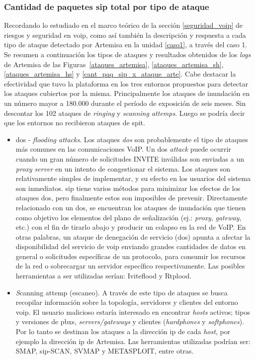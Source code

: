 \documentclass[a4paper,12pt]{report}
\begin{document}
{\subsubsection{Cantidad de paquetes \ac{sip} total por tipo de ataque}
Recordando lo estudiado en el marco teórico de la sección \ref{seguridad_voip}
de riesgos y seguridad en \ac{voip}, como así también la descripción y respuesta a
cada tipo de ataque detectado por Artemisa en la unidad \ref{caso1}, a través del caso 1.
Se resumen a continuación los tipos de ataques y resultados obtenidos de los \emph{logs}
de Artemisa de las 
\mbox{Figuras}~\ref{ataques_artemisa}, \ref{ataques_artemisa_sh}, \ref{ataques_artemisa_hs} y
\ref{cant_paq_sip_x_ataque_arte}. Cabe destacar la efectividad que tuvo la plataforma
en los tres entornos propuestos para
detectar los ataques cubiertos por la misma. Principalmente los ataques de
inundación en un número mayor a 180.000 durante el período de exposición de
seis meses. Sin descontar los 102 ataques de \emph{\emph{ringing}} y \emph{scanning
attemps}. Luego se podría decir que los entornos no recibieron ataques de
\ac{spit}.

\begin{itemize}

\item \ac{dos} - \emph{flooding attacks}.
Los ataques \emph{\ac{dos}} son probablemente el tipo de ataques
más comunes en las comunicaciones VoIP. Un \ac{dos} \emph{attack} puede ocurrir
cuando un gran número de solicitudes INVITE inválidas son enviadas a un
\emph{proxy server} en un intento de congestionar el sistema. Los ataques son
relativamente simples de implementar, y su efecto en los usuarios del sistema
son inmediatos. \ac{sip} tiene varios métodos para minimizar los efectos de los
ataques \ac{dos}, pero finalmente estos son imposibles de prevenir. \cite{madsen}  
Directamente relacionado con un \ac{dos}, se encuentran los ataques de inundación
que tienen como objetivo los elementos del plano de señalización
(ej.: \emph{proxy}, \emph{gateway}, etc.) con el fin de tirarlo abajo y producir un colapso en
la red de VoIP. \cite{nassarm}
En otras palabras, un ataque de denegación de servicio (\ac{dos})
apunta a afectar la disponibilidad del servicio de \ac{voip} enviando grandes
cantidades de datos en general o solicitudes específicas de un protocolo, para
consumir los recursos de la red o sobrecargar un servidor específico
respectivamente. Las posibles herramientas a ser utilizadas serían: Iviteflood y Rtplood.

\item \emph Scanning attemp (escaneo).
   A través de este tipo de ataques se busca recopilar información sobre la
topología, servidores y clientes del entorno  \ac{voip}. El usuario malicioso estaría
interesado en encontrar \emph{hosts} activos; tipos y versiones de \ac{pbx}s,
\emph{servers/gateways} y clientes (\emph{hardphones} y \emph{softphones}).
Por lo tanto se destinan los ataques a la dirección \ac{ip} de cada
\emph{host}, por  ejemplo la dirección \ac{ip} de Artemisa. Las  herramientas utilizadas
podrían ser: SMAP, \ac{sip}-SCAN, SVMAP y METASPLOIT, entre otras.


\end{itemize}}
\end{document}

